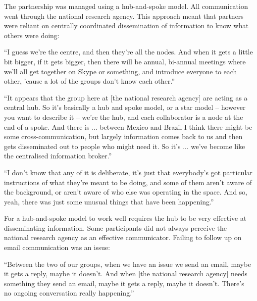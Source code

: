 The partnership was managed using a hub-and-spoke model. All communication went through the national research agency. This approach meant that partners were reliant on centrally coordinated dissemination of information to know what others were doing:

\begin{displayquote}[Participant 13/3]
\small
\enquote{I guess we're the centre, and then they're all the nodes. And when it gets a little bit bigger, if it gets bigger, then there will be annual, bi-annual meetings where we'll all get together on Skype or something, and introduce everyone to each other, 'cause a lot of the groups don't know each other.} 
\end{displayquote}

\begin{displayquote}[Participant 16/3]
\small
\enquote{It appears that the group here at [the national research agency] are acting as a central hub.  So it’s basically a hub and spoke model, or a star model – however you want to describe it – we're the hub, and each collaborator is a node at the end of a spoke.  And there is ... between Mexico and Brazil I think there might be some cross-communication, but largely information comes back to us and then gets disseminated out to people who might need it.  So it's ... we've become like the centralised information broker.} 
\end{displayquote}

\begin{displayquote}[Participant 22/3]
\small
\enquote{I don't know that any of it is deliberate, it's just that everybody's got particular instructions of what they're meant to be doing, and some of them aren't aware of the background, or aren't aware of who else was operating in the space. And so, yeah, there was just some unusual things that have been happening.} 
\end{displayquote}

For a hub-and-spoke model to work well requires the hub to be very effective at disseminating information. Some participants did not always perceive the national research agency as an effective communicator. Failing to follow up on email communication was an issue:

\begin{displayquote}[Participant 41/3]
\small
\enquote{Between the two of our groups, when we have an issue we send an email, maybe it gets a reply, maybe it doesn't. And when [the national research agency] needs something they send an email, maybe it gets a reply, maybe it doesn't. There's  no ongoing conversation really happening.} 
\end{displayquote}

